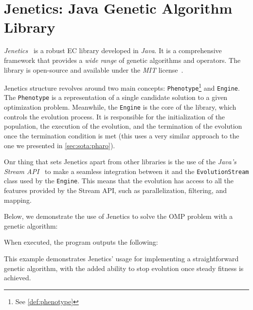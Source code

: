\section{Jenetics: Java Genetic Algorithm Library}
\label{sec:sota:jenetics}

  \emph{Jenetics}~\autocite{wilhelmstotterJeneticsJavaGenetica} is a robust
  EC library developed in \textit{Java}.
  It is a comprehensive framework that provides a \textit{wide range} of genetic
  algorithms and operators.
  The library is open-source and available under the \textit{MIT} 
  license~\autocite{MITLicense2006}.

  Jenetics structure revolves around two main concepts: 
  \texttt{Phenotype}\footnote{See \vref{def:phenotype}} and \texttt{Engine}.
  The \texttt{Phenotype} is a representation of a single candidate solution to
  a given optimization problem.
  Meanwhile, the \texttt{Engine} is the core of the library, which controls the
  evolution process.
  It is responsible for the initialization of the population, the execution of
  the evolution, and the termination of the evolution once the termination
  condition is met (this uses a very similar approach to the one we presented 
  in \vref{sec:sota:pharo}).

  Onr thing that sets Jenetics apart from other libraries is the use of the
  \textit{Java's Stream API}~\autocite{StreamJavaPlatform} to make a seamless
  integration between it and the \texttt{EvolutionStream} class used by the
  \texttt{Engine}.
  This means that the evolution has access to all the features provided by the
  Stream API, such as parallelization, filtering, and mapping.

  Below, we demonstrate the use of Jenetics to solve the OMP problem with a
  genetic algorithm:


  When executed, the program outputs the following:


  This example demonstrates Jenetics' usage for implementing a straightforward
  genetic algorithm, with the added ability to stop evolution once steady
  fitness is achieved.

